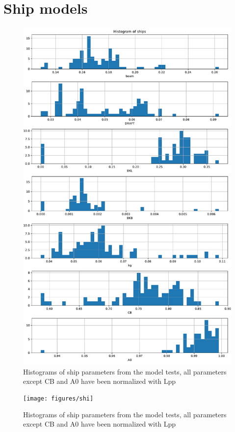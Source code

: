 \section{Ship models}\label{app:ships}
\begin{figure}[H]
    \centering
    \includegraphics[width=0.7\columnwidth]{figures/ship_parameters.pdf}
    \caption{Histograms of ship parameters from the model tests, all parameters except CB and A0 have been normalized with Lpp}
    \label{fig:ship_parameters}
\end{figure}

\begin{figure}[H]
    \centering
    \texttt{[image: figures/shi]}
    \caption{Histograms of ship parameters from the model tests, all parameters except CB and A0 have been normalized with Lpp}
    \label{fig:ship_parameters}
\end{figure}

